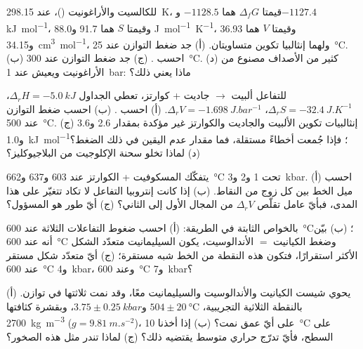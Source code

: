 \begin{exercise}[$\star\star$]\label{exo:b2:metamorphic-facies:7}
للكالسيت والأراغونيت ()، عند \qty{298.15}{K}، قيمتا $\Delta_f G$ هما $-1128.5$
و$-1127.4$ \unit{kJ.mol^{-1}}، وقيمتا $S$ هما 91.7 و88.0 \unit{J.mol^{-1}.K^{-1}}، وقيمتا $V$ هما 36.93
و\qty{34.15}{cm^3.mol^{-1}}، ولهما إنثالبيا تكوين متساويتان. (أ) جد
ضغط التوازن عند \qty{25}{\celsius}. (ب) احسب . (ج) جد
ضغط التوازن عند \qty{300}{\celsius}. (د) كثير من الأصداف مصنوع من الأراغونيت
ويعيش عند \qty{1}{bar}: ماذا يعني ذلك؟
\end{exercise}

\begin{exercise}[$\star\star$]\label{exo:b2:metamorphic-facies:8}
للتفاعل ألبيت $\to$ جاديت + كوارتز، تعطي الجداول $\Delta_r H = \qty{-5.0}{kJ}$،
$\Delta_r S = \qty{-32.4}{J.K^{-1}}$، $\Delta_r V = \qty{-1.698}{J.bar^{-1}}$. (أ)
احسب . (ب) احسب ضغط التوازن عند \qty{500}{\celsius}.
(ج) إنثالبيات تكوين الألبيت والجاديت والكوارتز غير مؤكدة بمقدار 2.6 و3.6
و\qty{1.0}{kJ.mol^{-1}}؛ فإذا جُمعت أخطاءً مستقلة، فما مقدار عدم اليقين في ذلك
الضغط؟ (د) لماذا تخلو سحنة الإكلوجيت من البلاجيوكليز؟
\end{exercise}

\begin{exercise}[$\star\star$]\label{exo:b2:metamorphic-facies:9}
يتفكّك المسكوفيت + الكوارتز عند 603 و637 و\qty{662}{\celsius} تحت 1 و2
و\qty{3}{kbar}. (أ) احسب ميل الخط بين كل زوج من النقاط. (ب) إذا كانت
إنتروبيا التفاعل لا تكاد تتغيّر على هذا المدى، فبأيّ عامل تقلّص $\Delta_r V$
من المجال الأول إلى الثاني؟ (ج) أيّ طور هو المسؤول؟
\end{exercise}

\begin{exercise}[$\star\star\star$]\label{exo:b2:metamorphic-facies:10}
بالخواص الثابتة في الطريقة: (أ) احسب ضغوط التفاعلات الثلاثة
عند \qty{600}{\celsius}؛ (ب) بيّن أنه عند \qty{600}{\celsius} وضغط
الكيانيت $=$ الأندالوسيت، يكون السيليمانيت متعدّد الشكل الأكثر استقرارًا، فتكون هذه النقطة من
الخط شبه مستقرة؛ (ج) أيّ متعدّد شكل مستقر عند \qty{600}{\celsius}
و\qty{4}{kbar}، وعند \qty{600}{\celsius} و\qty{7}{kbar}؟
\end{exercise}

\begin{exercise}[$\star\star\star$]\label{exo:b2:metamorphic-facies:11}
يحوي شيست الكيانيت والأندالوسيت والسيليمانيت معًا، وقد نمت ثلاثتها في
توازن. (أ) بالنقطة الثلاثية التجريبية، $504 \pm \qty{20}{\celsius}$
و$3.75 \pm \qty{0.25}{kbar}$، وبقشرة كثافتها \qty{2700}{kg.m^{-3}} ($g =
\qty{9.81}{m.s^{-2}}$)، على أيّ عمق نمت؟ (ب) إذا أخذنا \qty{10}{\celsius} على
السطح، فأيّ تدرّج حراري متوسط يقتضيه ذلك؟ (ج) لماذا تندر مثل هذه الصخور؟
\end{exercise}

